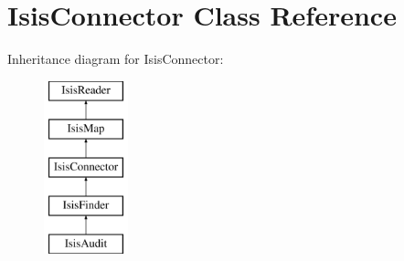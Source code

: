 \hypertarget{classIsisConnector}{
\section{IsisConnector Class Reference}
\label{classIsisConnector}
}
Inheritance diagram for IsisConnector:\begin{figure}[H]
\begin{center}
\leavevmode
\includegraphics[height=5.000000cm]{classIsisConnector}
\end{center}
\end{figure}
